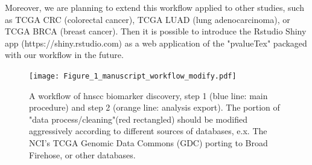 \documentclass[preprint,12pt]{elsarticle}
\newenvironment{MyColorPar}[1]{%
    \leavevmode\color{#1}\ignorespaces%
}{%
}%
\begin{document}
\begin{MyColorPar}{blue}
Moreover, we are planning to extend this workflow applied to other studies, such as TCGA CRC (colorectal cancer), TCGA LUAD (lung adenocarcinoma), or TCGA BRCA (breast cancer).
Then it is possible to introduce the Rstudio Shiny app (https://shiny.rstudio.com) as a web application of the "pvalueTex" packaged with our workflow in the future.

\begin{figure}
    \centering
    \texttt{[image: Figure\_1\_manuscript\_workflow\_modify.pdf]}
    \caption{A workflow of \acrshort{hnscc} biomarker discovery, step 1 (blue line: main procedure) and step 2 (orange line: analysis export). The portion of "data process/cleaning"(red rectangled) should be modified aggressively according to different sources of databases, e.x. The NCI's TCGA Genomic Data Commons (GDC) porting to Broad Firehose, or other databases.}
    \label{fig:workflow}
\end{figure}



\end{MyColorPar}
\end{document}
